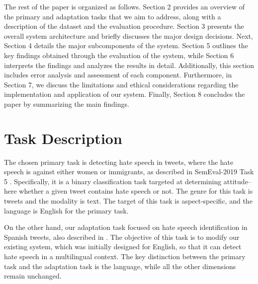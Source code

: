 \documentclass[11pt,a4paper]{article}
\begin{document}
   The rest of the paper is organized as follows. Section 2 provides an overview of the primary and adaptation tasks that we aim to address, along with a description of the dataset and the evaluation procedure. Section 3 presents the overall system architecture and briefly discusses the major design decisions. Next, Section 4 details the major subcomponents of the system. Section 5 outlines the key findings obtained through the evaluation of the system, while Section 6 interprets the findings and analyzes the results in detail. Additionally, this section includes error analysis and assessment of each component. Furthermore, in Section 7, we discuss the limitations and ethical considerations regarding the implementation and application of our system. Finally, Section 8 concludes the paper by summarizing the main findings.




\section{Task Description}
 The chosen primary task is detecting hate speech in tweets, where the hate speech is against either women or immigrants, as described in SemEval-2019 Task 5 \citep{basile-etal-2019-semeval}. Specifically, it is a binary classification task targeted at determining attitude–here whether a given tweet contains hate speech or not. The genre for this task is tweets and the modality is text. The target of this task is aspect-specific, and the language is English for the primary task. 
 
  On the other hand, our adaptation task focused on hate speech identification in Spanish tweets, also described in \citet{basile-etal-2019-semeval}. The objective of this task is to modify our existing system, which was initially designed for English, so that it can detect hate speech in a multilingual context. The key distinction between the primary task and the adaptation task is the language, while all the other dimensions remain unchanged.
\end{document}
